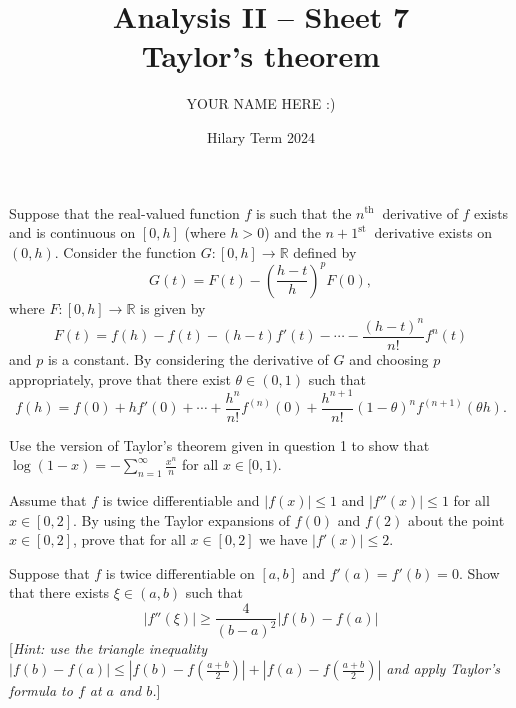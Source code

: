 \documentclass[answers]{exam}
\title{Analysis II -- Sheet 7\\Taylor's theorem}
\author{YOUR NAME HERE :)}
\date{Hilary Term 2024}
\begin{document}
\maketitle
\begin{questions}

\question%
Suppose that the real-valued function $f$ is such that the $n^{\text {th }}$ derivative of $f$ exists and is continuous on $[0, h]$ (where $h>0$) and the $n+1^{\text {st }}$ derivative exists on $(0, h)$. Consider the function $G:[0, h] \to \mathbb{R}$ defined by \[
	G(t)=F(t)-\left(\frac{h-t}{h}\right)^{p} F(0),
\] where $F:[0, h] \to \mathbb{R}$ is given by \[
	F(t)=f(h)-f(t)-(h-t) f'(t)-\cdots-\frac{(h-t)^{n}}{n !} f^{n}(t)
\] and $p$ is a constant. By considering the derivative of $G$ and choosing $p$ appropriately, prove that there exist $\theta \in(0,1)$ such that \[
	f(h)=f(0)+h f'(0)+\cdots+\frac{h^{n}}{n !} f^{(n)}(0)+\frac{h^{n+1}}{n!}(1-\theta)^{n} f^{(n+1)}(\theta h).
\]



\question%
Use the version of Taylor's theorem given in question 1 to show that $\log(1-x)=-\sum_{n=1}^\infty\frac{x^n}n$ for all $x\in[0,1)$.



\question%
Assume that $f$ is twice differentiable and $|f(x)| \leq 1$ and $|f''(x)| \leq 1$ for all $x \in[0,2]$. By using the Taylor expansions of $f(0)$ and $f(2)$ about the point $x \in[0,2]$, prove that for all $x \in[0,2]$ we have $|f'(x)| \leq 2$.



\question%
Suppose that $f$ is twice differentiable on $[a, b]$ and $f'(a)=f'(b)=0$. Show that there exists $\xi \in(a, b)$ such that \[
	\left|f''(\xi)\right| \geq \frac{4}{(b-a)^{2}}|f(b)-f(a)|
\] [\emph{Hint: use the triangle inequality $|f(b)-f(a)| \leq\left|f(b)-f\left(\frac{a+b}{2}\right)\right|+\left|f(a)-f\left(\frac{a+b}{2}\right)\right|$ and apply Taylor's formula to $f$ at $a$ and $b$.}]



\question%
\end{questions}
\end{document}
